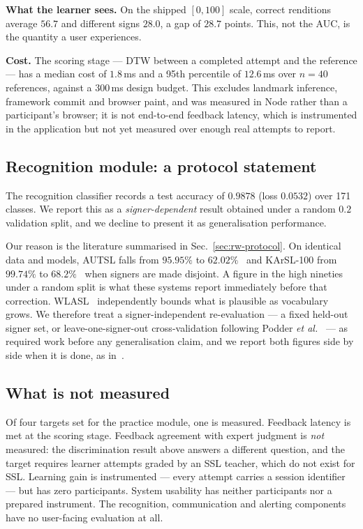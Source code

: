\documentclass[conference]{IEEEtran}
\begin{document}
\textbf{What the learner sees.} On the shipped $[0,100]$ scale, correct
renditions average $56.7$ and different signs $28.0$, a gap of $28.7$ points.
This, not the AUC, is the quantity a user experiences.

\textbf{Cost.} The scoring stage --- DTW between a completed attempt and the
reference --- has a median cost of $1.8$\,ms and a 95th percentile of
$12.6$\,ms over $n=40$ references, against a $300$\,ms design budget. This
excludes landmark inference, framework commit and browser paint, and was
measured in Node rather than a participant's browser; it is not end-to-end
feedback latency, which is instrumented in the application but not yet
measured over enough real attempts to report.

\subsection{Recognition module: a protocol statement}
\label{sec:eval-recognise}
The recognition classifier records a test accuracy of $0.9878$ (loss $0.0532$)
over 171 classes. We report this as a \emph{signer-dependent} result obtained
under a random $0.2$ validation split, and we decline to present it as
generalisation performance.

Our reason is the literature summarised in Sec.~\ref{sec:rw-protocol}. On
identical data and models, AUTSL falls from $95.95\%$ to
$62.02\%$~\cite{sincan2020autsl} and KArSL-100 from $99.74\%$ to
$68.2\%$~\cite{alyami2024isolated} when signers are made disjoint. A figure in
the high nineties under a random split is what these systems report
immediately before that correction. WLASL~\cite{li2020word} independently
bounds what is plausible as vocabulary grows. We therefore treat a
signer-independent re-evaluation --- a fixed held-out signer set, or
leave-one-signer-out cross-validation following Podder \emph{et
al.}~\cite{podder2023signer} --- as required work before any generalisation
claim, and we report both figures side by side when it is done, as
in~\cite{akdag2024enhancing}.

\subsection{What is not measured}
Of four targets set for the practice module, one is measured. Feedback
latency is met at the scoring stage. Feedback agreement with expert judgment
is \emph{not} measured: the discrimination result above answers a different
question, and the target requires learner attempts graded by an SSL teacher,
which do not exist for SSL. Learning gain is instrumented --- every attempt
carries a session identifier --- but has zero participants. System usability
has neither participants nor a prepared instrument. The recognition,
communication and alerting components have no user-facing evaluation at all.
\end{document}
